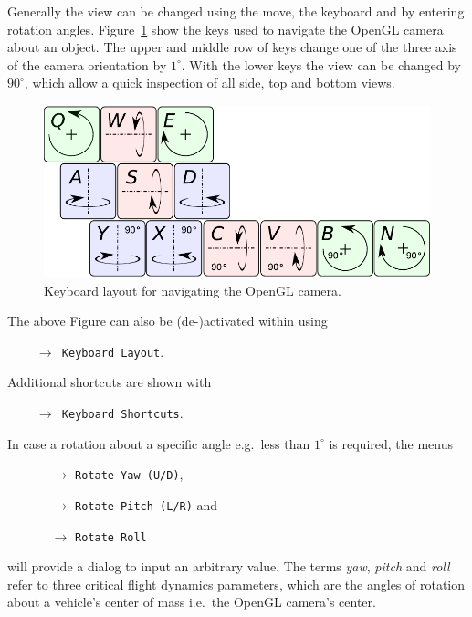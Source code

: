 Generally the view can be changed using the move, the keyboard and by entering rotation angles.
Figure~\ref{fig:keyboardmove} show the keys used to navigate the OpenGL camera about an object.
The upper and middle row of keys change one of the three axis of the camera orientation by $1^\circ$.
With the lower keys the view can be changed by $90^\circ$, which allow a quick inspection of all side, top and bottom views.
\begin{figure}[!hbt]
	\centering
	\includegraphics[height=50mm]{figs/gigamesh_keyboard_move_camera} %
	\caption{Keyboard layout for navigating the OpenGL camera.}
	\label{fig:keyboardmove}
\end{figure}
The above Figure can also be (de-)activated within \GigaMesh using
\begin{itemize}
	\item[] \texttt{ $\rightarrow$ Keyboard Layout}.
\end{itemize}
Additional shortcuts are shown with
\begin{itemize}
	\item[] \texttt{ $\rightarrow$ Keyboard Shortcuts}.
\end{itemize}
In case a rotation about a specific angle e.g.~less than $1^\circ$ is required, the menus
\begin{itemize}
	\item[] 
	\begin{itemize}
		\item[$\rightarrow$] \texttt{Rotate Yaw (U/D)}, 
		\item[$\rightarrow$] \texttt{Rotate Pitch (L/R)} and
		\item[$\rightarrow$] \texttt{Rotate Roll}
	\end{itemize}
\end{itemize}
will provide a dialog to input an arbitrary value. 
The terms \emph{yaw}, \emph{pitch} and \emph{roll} refer to three critical flight dynamics parameters,
which are the angles of rotation about a vehicle's center of mass i.e.~the OpenGL camera's center.

